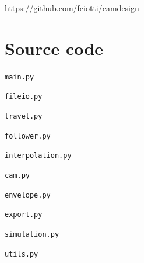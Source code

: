 \documentclass[a4paper,10pt,twoside]{article}
\begin{document}
https://github.com/fciotti/camdesign

\section{Source code}
\texttt{main.py}

\texttt{fileio.py}

\texttt{travel.py}

\texttt{follower.py}

\texttt{interpolation.py}

\texttt{cam.py}

\texttt{envelope.py}

\texttt{export.py}

\texttt{simulation.py}

\texttt{utils.py}
\end{document}

